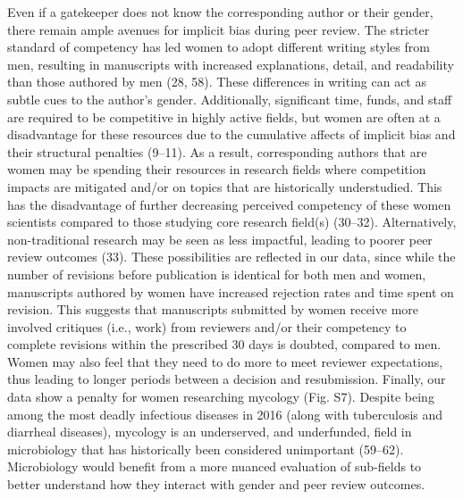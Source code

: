 \documentclass[11pt,]{article}
\begin{document}
Even if a gatekeeper does not know the corresponding author or their
gender, there remain ample avenues for implicit bias during peer review.
The stricter standard of competency has led women to adopt different
writing styles from men, resulting in manuscripts with increased
explanations, detail, and readability than those authored by men (28,
58). These differences in writing can act as subtle cues to the author's
gender. Additionally, significant time, funds, and staff are required to
be competitive in highly active fields, but women are often at a
disadvantage for these resources due to the cumulative affects of
implicit bias and their structural penalties (9--11). As a result,
corresponding authors that are women may be spending their resources in
research fields where competition impacts are mitigated and/or on topics
that are historically understudied. This has the disadvantage of further
decreasing perceived competency of these women scientists compared to
those studying core research field(s) (30--32). Alternatively,
non-traditional research may be seen as less impactful, leading to
poorer peer review outcomes (33). These possibilities are reflected in
our data, since while the number of revisions before publication is
identical for both men and women, manuscripts authored by women have
increased rejection rates and time spent on revision. This suggests that
manuscripts submitted by women receive more involved critiques (i.e.,
work) from reviewers and/or their competency to complete revisions
within the prescribed 30 days is doubted, compared to men. Women may
also feel that they need to do more to meet reviewer expectations, thus
leading to longer periods between a decision and resubmission. Finally,
our data show a penalty for women researching mycology (Fig. S7).
Despite being among the most deadly infectious diseases in 2016 (along
with tuberculosis and diarrheal diseases), mycology is an underserved,
and underfunded, field in microbiology that has historically been
considered unimportant (59--62). Microbiology would benefit from a more
nuanced evaluation of sub-fields to better understand how they interact
with gender and peer review outcomes.
\end{document}
